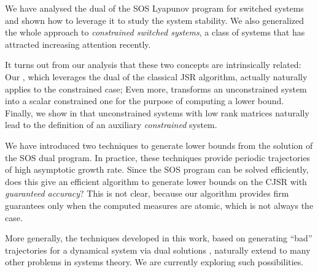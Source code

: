 We have analysed the dual of the SOS Lyapunov program for switched systems
and shown how to leverage it to study the system stability.
We also generalized the whole approach to \emph{constrained switched systems},
a class of systems that has attracted increasing attention recently.

It turns out from our analysis that these two concepts are intrinsically related:
Our , which leverages the dual of the classical JSR algorithm,
actually naturally applies to the constrained case;
Even more,  transforms an unconstrained system into a scalar constrained one for the purpose of computing a lower bound.
Finally, we show in  that unconstrained systems with low rank matrices naturally lead to the definition of an auxiliary \emph{constrained} system.


We have introduced two techniques to generate lower bounds from the solution of the SOS dual program.
In practice, these techniques provide periodic trajectories of high asymptotic growth rate.
Since the SOS program can be solved efficiently,
does this give an efficient algorithm to generate lower bounds on the CJSR with \emph{guaranteed accuracy}?
This is not clear, because our algorithm provides firm guarantees only when the computed measures are atomic, which is not always the case.

More generally, the techniques developed in this work, based on
generating ``bad'' trajectories for a dynamical system via dual solutions%
, naturally extend to many other problems in systems theory. We are currently
exploring such possibilities.

